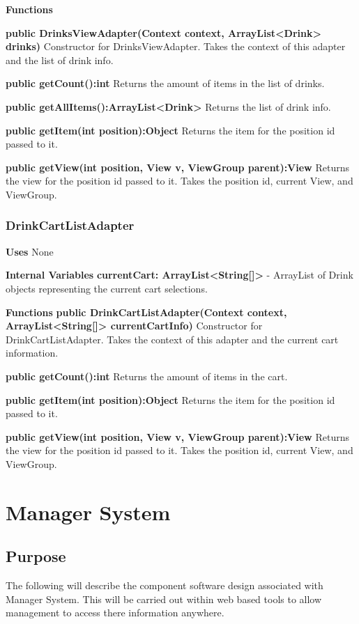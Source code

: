 \documentclass [10pt]{article}
\begin{document}
\textbf{Functions}

\textbf{public DrinksViewAdapter(Context context, ArrayList<Drink> drinks)}
Constructor for DrinksViewAdapter. Takes the context of this adapter and the list of drink info.

\textbf{public getCount():int}
Returns the amount of items in the list of drinks.

\textbf{public getAllItems():ArrayList<Drink>}
Returns the list of drink info.

\textbf{public getItem(int position):Object}
Returns the item for the position id passed to it.

\textbf{public getView(int position, View v, ViewGroup parent):View}
Returns the view for the position id passed to it. Takes the position id, current View, and ViewGroup.

\subsubsection{DrinkCartListAdapter}

\textbf{Uses} None

\textbf{Internal Variables}
\textbf{currentCart: ArrayList<String[]>} - ArrayList of Drink objects representing the current cart selections.

\textbf{Functions}
\textbf{public DrinkCartListAdapter(Context context, ArrayList<String[]> currentCartInfo)}
Constructor for DrinkCartListAdapter. Takes the context of this adapter and the current cart information.

\textbf{public getCount():int}
Returns the amount of items in the cart.

\textbf{public getItem(int position):Object}
Returns the item for the position id passed to it.

\textbf{public getView(int position, View v, ViewGroup parent):View}
Returns the view for the position id passed to it. Takes the position id, current View, and ViewGroup.


\section {Manager System}


\subsection{Purpose}
The following will describe the component software design associated with Manager System. This will be carried out within web based tools to allow management to access there information anywhere.
\end{document}
